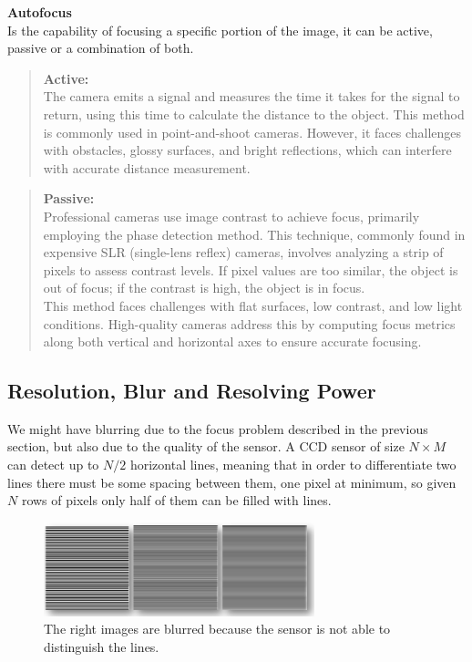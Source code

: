\textbf{Autofocus}
\\
Is the capability of focusing a specific portion of the image, it can be active, passive or a combination of both.
\begin{quote}
    \textbf{Active:}  
    \\The camera emits a signal and measures the time it takes for the signal to return, using this time to calculate the distance to the object. 
    This method is commonly used in point-and-shoot cameras. 
    However, it faces challenges with obstacles, glossy surfaces, and bright reflections, which can interfere with accurate distance measurement.
\end{quote}
\begin{quote}
    \textbf{Passive:}
    \\Professional cameras use image contrast to achieve focus, primarily employing the phase detection method. 
    This technique, commonly found in expensive SLR (single-lens reflex) cameras, involves analyzing a strip of pixels to assess contrast levels. 
    If pixel values are too similar, the object is out of focus; if the contrast is high, the object is in focus.
    \\
    This method faces challenges with flat surfaces, low contrast, and low light conditions. 
    High-quality cameras address this by computing focus metrics along both vertical and horizontal axes to ensure accurate focusing.
\end{quote}

\subsection{Resolution, Blur and Resolving Power}

We might have blurring due to the focus problem described in the previous section, but also due to the quality of the sensor. A CCD sensor of size $N\times M$ can detect up to $N/2$ horizontal lines, meaning that in order to differentiate two lines there must be some spacing between them, one pixel at minimum, so given $N$ rows of pixels only half of them can be filled with lines.

\begin{figure}[H]
    \centering
    \includegraphics[width=0.7\textwidth]{Figures/blur.png}
    \caption{The right images are blurred because the sensor is not able to distinguish the lines.}
    \label{fig:blur}
\end{figure}

